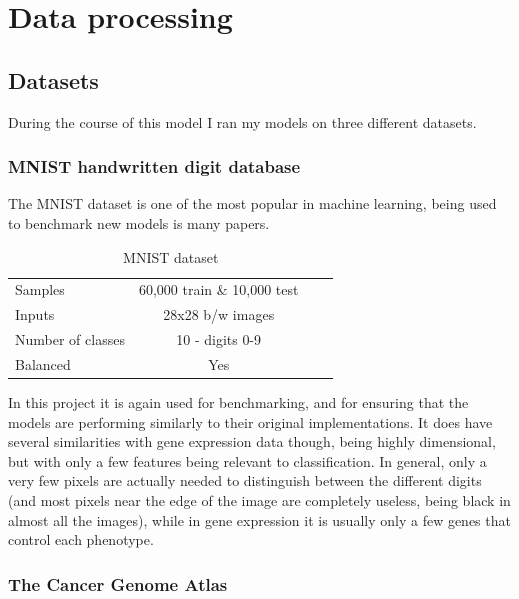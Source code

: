 \documentclass[12pt,a4paper,twoside,openright]{report}
\begin{document}
\section{Data processing}

\subsection{Datasets}

During the course of this model I ran my models on three different datasets.

\subsubsection{MNIST handwritten digit database}

The MNIST dataset is one of the most popular in machine learning, being used to benchmark new models is many papers.
\begin{table}[H]
  \label{tab:requirements}
  \small %
  \centering %
  \begin{tabular}{lccr} %
  \toprule[\heavyrulewidth]
  Samples & 60,000 train \& 10,000 test \\
  Inputs & 28x28 b/w images  \\
  Number of classes & 10 - digits 0-9 \\
  Balanced & Yes \\
  \bottomrule[\heavyrulewidth] 
  \end{tabular}
  \caption{MNIST dataset} 
\end{table}

In this project it is again used for benchmarking, and for ensuring that the models are performing similarly to their original implementations.
It does have several similarities with gene expression data though, being highly dimensional, but with only a few features being relevant to 
classification. In general, only a very few pixels are actually needed to distinguish between the different digits (and most pixels near the 
edge of the image are completely useless, being black in almost all the images), while in gene expression it is usually only a few genes 
that control each phenotype.

\subsubsection{The Cancer Genome Atlas}
\end{document}
